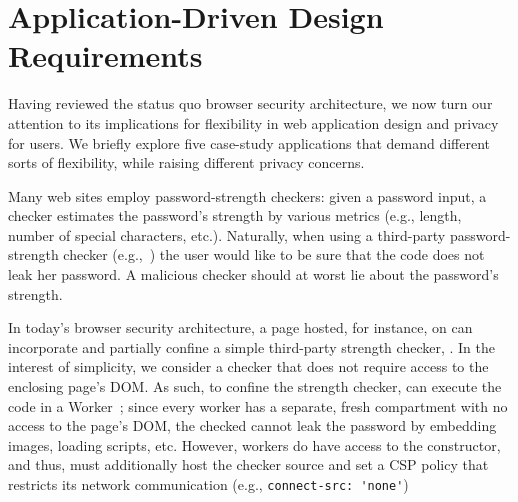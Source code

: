 \section{Application-Driven Design Requirements}
\label{sec:goals}

Having reviewed the status quo browser security architecture, we now
turn our attention to its implications for flexibility in web
application design and privacy for users. We briefly explore five
case-study applications that demand different sorts of flexibility,
while raising different privacy concerns.

Many web sites employ password-strength checkers:
%
given a password input, a checker estimates the password's strength by
various metrics (e.g., length, number of special characters, etc.).
%
Naturally, when using a third-party password-strength checker
(e.g.,~\cite{checker1}) the user would like to be sure that the
code does not leak her password.
%
A malicious checker should at worst lie about the password's strength.

In today's browser security architecture, a page hosted, for instance,
on  can incorporate and partially confine a
simple third-party strength checker, .
%
In the interest of simplicity, we consider a checker that does not
require access to the enclosing page's DOM.
%
As such, to confine the strength checker, 
can execute the code in a Worker~\cite{workers};
%
since every worker has a separate, fresh compartment with no
access to the page's DOM, the checked cannot leak the password
by embedding images, loading scripts, etc.
%
However, workers do have access to the \xhr{} constructor, and thus,
 must additionally host the checker source and set
a CSP policy that restricts its network communication (e.g.,
\verb|connect-src: 'none'|)
%

